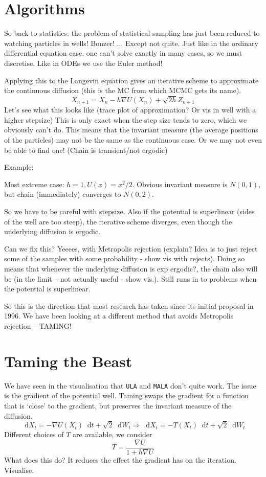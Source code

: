 \documentclass[a4paper]{article}
\newcommand{\dif}{\mathop{}\!\mathrm{d}}
\newcommand{\grad}{\nabla}
\begin{document}
\section{Algorithms}
 So back to statistics: the problem of statistical sampling has just been reduced to watching particles in wells! Bonzer! ... Except not quite. Just like in the ordinary differential equation case, one can't solve exactly in many cases, so we must discretise. Like in ODEs we use the Euler method! 
 
 Applying this to the Langevin equation gives an iterative scheme to approximate the continuous diffusion (this is the MC from which MCMC gets its name). 
 \[X_{n+1} = X_n - h\grad U(X_n)  + \sqrt{2h}Z_{n+1}\]
 Let's see what this looks like (trace plot of approximation? Or vis in well with a higher stepsize) This is only exact when the step size tends to zero, which we obviously can't do. This means that the invariant measure (the average positions of the particles) may not be the same as the continuous case. Or we may not even be able to find one! (Chain is transient/not ergodic) 
 
 Example:
 
 Most extreme case: \(h=1, U(x)=x^2/2\). Obvious invariant measure is \(N(0,1)\), but chain (immediately) converges to \(N(0,2)\). 
 
 So we have to be careful with stepsize. Also if the potential is superlinear (sides of the well are too steep), the iterative scheme diverges, even though the underlying diffusion is ergodic.
 
 
 Can we fix this? Yeeees, with Metropolis rejection (explain? Idea is to just reject some of the samples with some probability - show vis with rejects). Doing so means that whenever the underlying diffusion is exp ergodic?, the chain also will be (in the limit -- not actually useful - show vis.). Still runs in to problems when the potential is superlinear.
 
 So this is the direction that most research has taken since its initial proposal in 1996. We have been looking at a different method that avoids Metropolis rejection -- TAMING!
 
 \section{Taming the Beast}
 We have seen in the visualisation that \texttt{ULA} and \texttt{MALA} don't quite work. The issue is the gradient of the potential well. Taming swaps the gradient for a function that is `close' to the gradient, but preserves the invariant measure of the diffusion.
\[\dif X_t = -\grad U(X_t) \dif t +\sqrt{2}\dif W_t \Longrightarrow \dif X_t = -T(X_t)\dif t +\sqrt{2}\dif W_t \]
Different choices of \(T\) are available, we consider 
\[T=\frac{\grad U }{1+h\grad U}\]
What does this do? It reduces the effect the gradient has on the iteration. Visualise.
\end{document}
